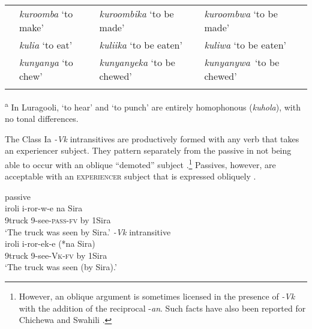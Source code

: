 \documentclass[output=paper]{langsci/lanmgscibook}
\begin{document}
\begin{table}
\begin{tabularx}{\textwidth}{lp{2.5cm}XX}
\tablevspace & \textit{kuroomba} \newline ‘to make’ & \textit{kuroombika} \newline ‘to be made’ & \textit{kuroombwa} \newline ‘to be made’\\
\tablevspace & \textit{kulia} \newline ‘to eat’ & \textit{kuliika} \newline ‘to be eaten’ & \textit{kuliwa} \newline ‘to be eaten’\\
\tablevspace & \textit{kunyanya} \newline ‘to chew’ & \textit{kunyanyeka} \newline ‘to be chewed’ & \textit{kunyanywa}~\newline ‘to be chewed’\\ 
\lspbottomrule
\end{tabularx}
\textsuperscript{a} In Luragooli, ‘to hear’ and ‘to punch’ are entirely homophonous (\textit{kuhola}), with no tonal differences.

\end{table}

The Class Ia \textit{-Vk} intransitives are productively formed with any verb that takes an experiencer subject. They pattern separately from the passive in not being able to occur with an oblique “demoted” subject .\footnote{However, an oblique argument is sometimes licensed in the presence of \textit{-Vk} with the addition of the reciprocal -\textit{an}. Such facts have also been reported for Chichewa and Swahili \citep{Dubinsky1996,SeidlDimitriadis2003}.} Passives, however, are acceptable with an \textsc{experiencer} subject that is expressed obliquely .

\ea\label{ex:gluckman:18}
  \ea \label{ex:gluckman:18a}
  {{passive}}\\
  \gll iroli      i-ror-w-e         na Sira\\
      9truck  9-see-\textsc{pass-fv} by 1Sira\\
  \glt ‘The truck was seen by Sira.’ 
  \ex\label{ex:gluckman:18b}
  {{\textit{-Vk}}{ intransitive}}\\
  \gll iroli    i-ror-ek-e       (*na Sira)\\
      9truck 9-see-\textsc{Vk}\textsc{-}\textsc{fv}   \hphantom{(*}by 1Sira\\
  \glt ‘The truck was seen (by Sira).’
  \z
\z
\end{document}
